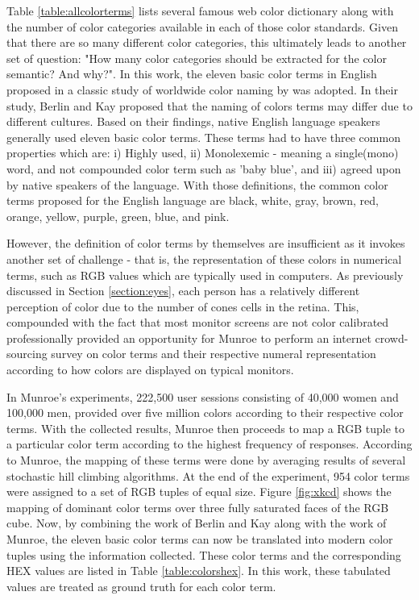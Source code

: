 Table \ref{table:allcolorterms} lists several famous web color dictionary along with the number of color categories available in each of those color standards. Given that there are so many different color categories, this ultimately leads to another set of question: "How many color categories should be extracted for the color semantic? And why?". In this work, the eleven basic color terms in English proposed in a classic study of worldwide color naming by \cite{berlinandkay} was adopted. In their study, Berlin and Kay proposed that the naming of colors terms may differ due to different cultures. Based on their findings, native English language speakers generally used eleven basic color terms. These terms had to have three common properties which are: i) Highly used, ii) Monolexemic - meaning a single(mono) word, and not compounded color term such as 'baby blue', and iii) agreed upon by native speakers of the language. With those definitions, the common color terms proposed for the English language are black, white, gray, brown, red, orange, yellow, purple, green, blue, and pink. 

However, the definition of color terms by themselves are insufficient as it invokes another set of challenge - that is, the representation of these colors in numerical terms, such as RGB values which are typically used in computers. As previously discussed in Section \ref{section:eyes}, each person has a relatively different perception of color due to the number of cones cells in the retina. This, compounded with the fact that most monitor screens are not color calibrated professionally provided an opportunity for Munroe \cite{munroe2010color} to perform an internet crowd-sourcing survey on color terms and their respective numeral representation according to how colors are displayed on typical monitors.

In Munroe's experiments, 222,500 user sessions consisting of 40,000 women and 100,000 men, provided over five million colors according to their respective color terms. With the collected results, Munroe then proceeds to map a RGB tuple to a particular color term according to the highest frequency of responses. According to Munroe, the mapping of these terms were done by averaging results of several stochastic hill climbing algorithms. At the end of the experiment, 954 color terms were assigned to a set of RGB tuples of equal size. Figure \ref{fig:xkcd} shows the mapping of dominant color terms over three fully saturated faces of the RGB cube. Now, by combining the work of Berlin and Kay along with the work of Munroe, the eleven basic color terms can now be translated into modern color tuples using the information collected. These color terms and the corresponding HEX values are listed in Table \ref{table:colorshex}. In this work, these tabulated values are treated as ground truth for each color term. 


